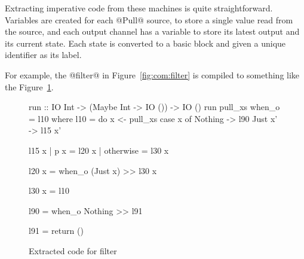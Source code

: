 Extracting imperative code from these machines is quite straightforward.
Variables are created for each @Pull@ source, to store a single value read from the source, and each output channel has a variable to store its latest output and its current state.
Each state is converted to a basic block and given a unique identifier as its label.

For example, the @filter@ in Figure~\ref{fig:com:filter} is compiled to something like the Figure~\ref{fig:extract:filter}.

\begin{figure}
\begin{code}
run :: IO Int -> (Maybe Int -> IO ()) -> IO ()
run pull_xs when_o = l10
 where
  l10 = do  x  <- pull_xs
            case x of
             Nothing -> l90
             Just x' -> l15 x'

  l15 x | p x       = l20 x
        | otherwise = l30 x

  l20 x =   when_o (Just x)  >> l30 x

  l30 x =   l10

  l90   =   when_o Nothing  >> l91

  l91   =   return ()
\end{code}
\caption{Extracted code for filter}
\label{fig:extract:filter}
\end{figure}

